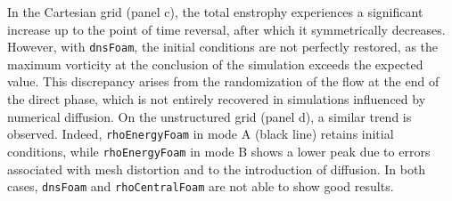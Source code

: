 \documentclass[a5paper]{sapthesis}
\begin{document}
	In the Cartesian grid (panel c), the total enstrophy experiences a significant increase up to the point of time reversal, after which it symmetrically decreases. However, with \texttt{dnsFoam}, the initial conditions are not perfectly restored, as the maximum vorticity at the conclusion of the simulation exceeds the expected value. This discrepancy arises from the randomization of the flow at the end of the direct phase, which is not entirely recovered in simulations influenced by numerical diffusion. On the unstructured grid (panel d), a similar trend is observed. Indeed, \texttt{rhoEnergyFoam} in mode A (black line) retains initial conditions, while \texttt{rhoEnergyFoam} in mode B shows a lower peak due to errors associated with mesh distortion and to the introduction of diffusion. In both cases, \texttt{dnsFoam} and \texttt{rhoCentralFoam} are not able to show good results.
	
\end{document}
